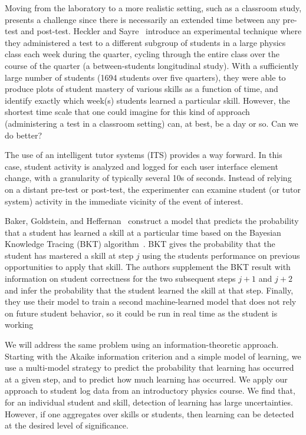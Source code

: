 \documentclass{edm_template}
\begin{document}
Moving from the laboratory to a more realistic setting, such as a
classroom study, presents a challenge since there is necessarily an
extended time between any pre-test and post-test.  Heckler and 
Sayre~\citeyear{heckler_what_2010} introduce an experimental technique
where they administered a test to a different subgroup of students in
a large physics class each week during the quarter, cycling through
the entire class over the course of the quarter (a
between-students longitudinal study).  With a sufficiently large number
of students (1694 students over five quarters), they were able to produce
plots of student mastery of various skills as a function of time, and
identify exactly which week(s) students learned a particular skill.
However, the shortest time scale that one could imagine for this
kind of approach (administering a test in a classroom setting) can, at
best, be a day or so.  Can we do better?

The use of an intelligent tutor systems (ITS) provides a way forward.
In this case, student activity is
analyzed and logged for each user interface element change, with a
granularity of typically several 10s of seconds.  Instead of relying
on a distant pre-test or post-test, the experimenter can examine
student (or tutor system) activity in the immediate vicinity of the
event of interest.

Baker, Goldstein, and Heffernan~\citeyear{baker_detecting_2011}
construct a model that predicts the probability that a student has
learned a skill at a particular time based on the Bayesian Knowledge
Tracing (BKT) algorithm~\cite{corbett_knowledge_1995}.  BKT gives
the probability that the student has mastered a skill at step $j$
using the students performance on previous opportunities to apply that
skill.  The authors supplement the BKT result with
information on student correctness for the two subsequent steps $j+1$
and $j+2$ and infer the probability that the student learned
the skill at that step.  Finally, they use their model to train a
second machine-learned model that does not rely on future student behavior,
so it could be run in real time as the student is working

We will address the same problem using an information-theoretic approach.
Starting with the Akaike information criterion and a simple model of
learning, we use a multi-model strategy to predict the probability that 
learning has occurred at a given step, and to predict how much
learning has occurred.  We apply our approach to student log data from
an introductory physics course.  We find that, for an individual
student and skill, detection of learning has large uncertainties.
However, if one aggregates over skills or students, then learning can
be detected at the desired level of significance.
\end{document}
